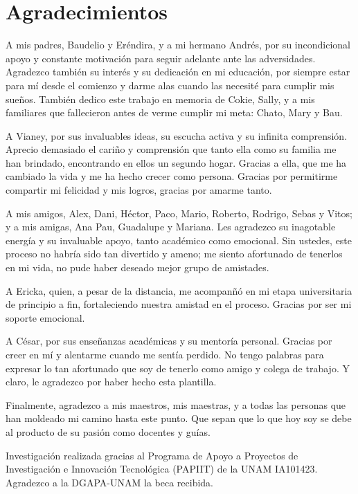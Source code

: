 \chapter*{Agradecimientos}

A mis padres, Baudelio y Er\'endira, y a mi hermano Andr\'es, por su
incondicional apoyo y constante motivaci\'on para seguir adelante ante las
adversidades. Agradezco tambi\'en su inter\'es y su dedicaci\'on en mi
educaci\'on, por siempre estar para m\'i desde el comienzo y darme alas cuando
las necesit\'e para cumplir mis sue\~nos. Tambi\'en dedico este trabajo en
memoria de Cokie, Sally, y a mis familiares que fallecieron antes de verme
cumplir mi meta: Chato, Mary y Bau.

A Vianey, por sus invaluables ideas, su escucha activa y su infinita
comprensi\'on. Aprecio demasiado el cari\~no y comprensi\'on que tanto ella como
su familia me han brindado, encontrando en ellos un segundo hogar. Gracias a
ella, que me ha cambiado la vida y me ha hecho crecer como persona. Gracias por
permitirme compartir mi felicidad y mis logros, gracias por amarme tanto.

A mis amigos, Alex, Dani, H\'ector, Paco, Mario, Roberto, Rodrigo, Sebas y
Vitos; y a mis amigas, Ana Pau, Guadalupe y Mariana. Les agradezco su inagotable
energ\'ia y su invaluable apoyo, tanto acad\'emico como emocional. Sin ustedes,
este proceso no habr\'ia sido tan divertido y ameno; me siento afortunado de
tenerlos en mi vida, no pude haber deseado mejor grupo de amistades.

A Ericka, quien, a pesar de la distancia, me acompan\~n\'o en mi etapa
universitaria de principio a fin, fortaleciendo nuestra amistad en el proceso.
Gracias por ser mi soporte emocional.

A C\'esar, por sus ense\~nanzas acad\'emicas y su mentor\'ia personal. Gracias por
creer en m\'i y alentarme cuando me sent\'ia perdido. No tengo palabras para
expresar lo tan afortunado que soy de tenerlo como amigo y colega de trabajo. Y
claro, le agradezco por haber hecho esta plantilla.

Finalmente, agradezco a mis maestros, mis maestras, y a todas las personas que
han moldeado mi camino hasta este punto. Que sepan que lo que hoy soy se debe al
producto de su pasi\'on como docentes y gu\'ias.

Investigaci\'on realizada gracias al Programa de Apoyo a Proyectos de
Investigaci\'on e Innovaci\'on Tecnol\'ogica (PAPIIT) de la UNAM IA101423.
Agradezco a la DGAPA-UNAM la beca recibida.